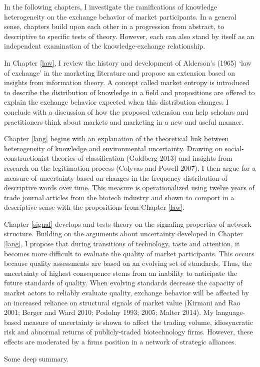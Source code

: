 In the following chapters, I investigate the ramifications of knowledge heterogeneity on the exchange behavior of market participants. In a general sense, chapters build upon each other in a progression from abstract, to descriptive to specific tests of theory. However, each can also stand by itself as an independent examination of the knowledge-exchange relationship. 

In Chapter \ref{law}, I review the history and development of Alderson's (1965) `law of exchange' in the marketing literature and propose an extension based on insights from information theory. A concept called market entropy is introduced to describe the distribution of knowledge in a field and propositions are offered to explain the exchange behavior expected when this distribution changes. I conclude with a discussion of how the proposed extension can help scholars and practitioners think about markets and marketing in a new and useful manner. 

Chapter \ref{lang} begins with an explanation of the theoretical link between heterogeneity of knowledge and environmental uncertainty. Drawing on social-constructionist theories of classification (Goldberg 2013) and insights from research on the legitimation process (Colyvas and Powell 2007), I then argue for a measure of uncertainty based on changes in the frequency distribution of descriptive words over time. This measure is operationalized using twelve years of trade journal articles from the biotech industry and shown to comport in a descriptive sense with the propositions from Chapter \ref{law}. 

Chapter \ref{signal} develops and tests theory on the signaling properties of network structure. Building on the arguments about uncertainty developed in Chapter \ref{lang}, I propose that during transitions of technology, taste and attention, it becomes more difficult to evaluate the quality of market participants. This occurs because quality assessments are based on an evolving set of standards. Thus, the uncertainty of highest consequence stems from an inability to anticipate the future standards of quality. When evolving standards decrease the capacity of market actors to reliably evaluate quality, exchange behavior will be affected by an increased reliance on structural signals of market value (Kirmani and Rao 2001; Berger and Ward 2010; Podolny 1993; 2005; Malter 2014). My language-based measure of uncertainty is shown to affect the trading volume, idiosyncratic risk and abnormal returns of publicly-traded biotechnology firms. However, these effects are moderated by a firms position in a network of strategic alliances.

Some deep summary.